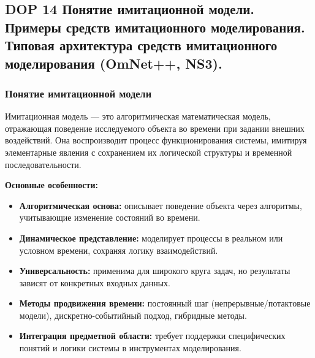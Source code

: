 \subsection{DOP 14 Понятие имитационной модели. Примеры средств имитационного моделирования.
Типовая архитектура средств имитационного моделирования (OmNet++, NS3).}

\subsubsection*{Понятие имитационной модели}
Имитационная модель — это алгоритмическая математическая модель, отражающая
поведение исследуемого объекта во времени при задании внешних воздействий.
Она воспроизводит процесс функционирования системы,
имитируя элементарные явления с сохранением их логической структуры и временной последовательности.

\textbf{Основные особенности:}
\begin{itemize}
    \item \textbf{Алгоритмическая основа:}
		описывает поведение объекта через алгоритмы,
		учитывающие изменение состояний во времени.
    \item \textbf{Динамическое представление:}
		моделирует процессы в реальном или условном времени,
		сохраняя логику взаимодействий.
    \item \textbf{Универсальность:}
		применима для широкого круга задач,
		но результаты зависят от конкретных входных данных.
    \item \textbf{Методы продвижения времени:}
		постоянный шаг (непрерывные/потактовые модели),
		дискретно-событийный подход, гибридные методы.
    \item \textbf{Интеграция предметной области:}
		требует поддержки специфических понятий и логики системы
		в инструментах моделирования.
\end{itemize}

